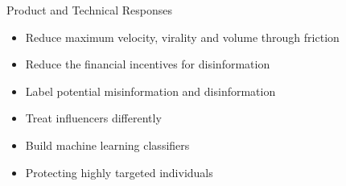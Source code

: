 \documentclass[nobackground,dvipsnames,table,aspectratio=169]{beamer}
\begin{document}
\begin{frame}{Product and Technical Responses}
    \large
    \begin{itemize}
        \item Reduce maximum velocity, virality and volume through friction
        \item Reduce the financial incentives for disinformation
        \item Label potential misinformation and disinformation
        \item Treat influencers differently
        \item Build machine learning classifiers
        \item Protecting highly targeted individuals
    \end{itemize}
\end{frame}
\end{document}
